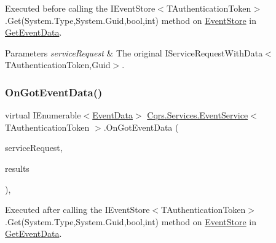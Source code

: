 Executed before calling the I\+Event\+Store$<$\+T\+Authentication\+Token$>$.\+Get(\+System.\+Type,\+System.\+Guid,bool,int) method on \hyperlink{namespaceCqrs_1_1EventStore}{Event\+Store} in \hyperlink{classCqrs_1_1Services_1_1EventService_a9a68d774ac754e39be56d3e0449f14d7_a9a68d774ac754e39be56d3e0449f14d7}{Get\+Event\+Data}. 


\begin{DoxyParams}{Parameters}
{\em service\+Request} & The original I\+Service\+Request\+With\+Data$<$\+T\+Authentication\+Token,\+Guid$>$.\\
\hline
\end{DoxyParams}
\mbox{\label{classCqrs_1_1Services_1_1EventService_a16030e800b05cea77fd2183db7296804_a16030e800b05cea77fd2183db7296804}} 
\subsubsection{\texorpdfstring{On\+Got\+Event\+Data()}{OnGotEventData()}}
{\footnotesize\ttfamily virtual I\+Enumerable$<$\hyperlink{classCqrs_1_1Events_1_1EventData}{Event\+Data}$>$ \hyperlink{classCqrs_1_1Services_1_1EventService}{Cqrs.\+Services.\+Event\+Service}$<$ T\+Authentication\+Token $>$.On\+Got\+Event\+Data (\begin{DoxyParamCaption}\item[{\hyperlink{interfaceCqrs_1_1Services_1_1IServiceRequestWithData}{I\+Service\+Request\+With\+Data}$<$ T\+Authentication\+Token, Guid $>$}]{service\+Request,  }\item[{I\+Enumerable$<$ \hyperlink{classCqrs_1_1Events_1_1EventData}{Event\+Data} $>$}]{results }\end{DoxyParamCaption})\hspace{0.3cm}{\ttfamily [protected]}, {\ttfamily [virtual]}}



Executed after calling the I\+Event\+Store$<$\+T\+Authentication\+Token$>$.\+Get(\+System.\+Type,\+System.\+Guid,bool,int) method on \hyperlink{namespaceCqrs_1_1EventStore}{Event\+Store} in \hyperlink{classCqrs_1_1Services_1_1EventService_a9a68d774ac754e39be56d3e0449f14d7_a9a68d774ac754e39be56d3e0449f14d7}{Get\+Event\+Data}. 


